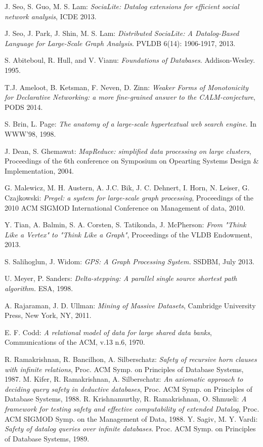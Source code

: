 
\begin{thebibliography}{99}


 J. Seo, S. Guo, M. S. Lam: \textit{SociaLite: Datalog extensions for efficient social network analysis}, ICDE 2013.

 J. Seo, J. Park, J. Shin, M. S. Lam: \textit{Distributed SociaLite: A Datalog-Based Language for Large-Scale Graph Analysis}. PVLDB 6(14): 1906-1917, 2013.

 S. Abiteboul, R. Hull, and V. Vianu: \textit{Foundations of Databases}. Addison-Wesley. 1995.

 T.J. Ameloot, B. Ketsman, F. Neven, D. Zinn: \textit{Weaker Forms of Monotonicity for Declarative Networking: a more fine-grained answer to the CALM-conjecture}, PODS 2014.

 S. Brin, L. Page: \textit{The anatomy of a large-scale hypertextual web search engine.} In WWW’98, 1998.

 J. Dean, S. Ghemawat: \textit{MapReduce: simplified data processing on large clusters}, Proceedings of the 6th conference on Symposium on Opearting Systems Design \& Implementation, 2004.

 G. Malewicz, M. H. Austern, A. J.C. Bik, J. C. Dehnert, I. Horn, N. Leiser, G. Czajkowski: \textit{Pregel: a system for large-scale graph processing}, Proceedings of the 2010 ACM SIGMOD International Conference on Management of data, 2010.

 Y. Tian, A. Balmin, S. A. Corsten, S. Tatikonda, J. McPherson: \textit{From "Think Like a Vertex" to "Think Like a Graph"}, Proceedings of the VLDB Endowment, 2013.

S. Salihoglun, J. Widom: \textit{GPS: A Graph Processing System.} SSDBM, July 2013.

 U. Meyer, P. Sanders: \textit{Delta-stepping: A parallel single source shortest path algorithm.} ESA, 1998.

 A. Rajaraman, J. D. Ullman: \textit{Mining of Massive Datasets}, Cambridge University Press, New York, NY, 2011.

 E. F. Codd: \textit{A relational model of data for large shared data banks}, Communications of the ACM, v.13 n.6, 1970.

 R. Ramakrishnan, R. Bancilhon, A. Silberschatz:  \textit{Safety of recursive horn clauses with infinite relations}, Proc. ACM Symp. on Principles of Database Systems, 1987.
 M. Kifer, R. Ramakrishnan, A. Silberschatz:  \textit{An axiomatic approach to deciding query safety in deductive databases}, Proc. ACM Symp. on Principles of Database Systems, 1988.
 R. Krishnamurthy, R. Ramakrishnan, O. Shmueli:  \textit{A framework for testing safety and effective computability of extended Datalog}, Proc. ACM SIGMOD Symp. on the Management of Data, 1988.
 Y. Sagiv, M. Y. Vardi:  \textit{Safety of datalog queries over infinite databases}.  Proc. ACM Symp. on Principles of Database Systems, 1989.


\end{thebibliography}
